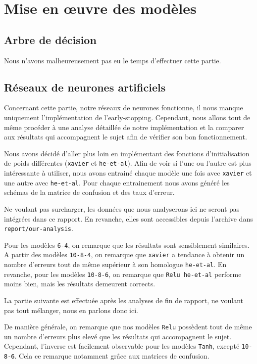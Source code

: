 \chapter{Mise en œuvre des modèles}

\section{Arbre de décision}

Nous n'avons malheureusement pas eu le temps d'effectuer cette partie.

\section{Réseaux de neurones artificiels}

Concernant cette partie, notre réseaux de neurones fonctionne, il nous manque uniquement l'implémentation de l'early-stopping. Cependant, nous allons tout de même procéder à une analyse détaillée de notre implémentation et la comparer aux résultats qui accompagnent le sujet afin de vérifier son bon fonctionnement.

Nous avons décidé d'aller plus loin en implémentant des fonctions d'initialisation de poids différentes (\texttt{xavier} et \texttt{he-et-al}). Afin de voir si l'une ou l'autre est plus intéressante à utiliser, nous avons entrainé chaque modèle une fois avec \texttt{xavier} et une autre avec \texttt{he-et-al}. Pour chaque entrainement nous avons généré les schémas de la matrice de confusion et des taux d'erreur.

Ne voulant pas surcharger, les données que nous analyserons ici ne seront pas intégrées dans ce rapport. En revanche, elles sont accessibles depuis l'archive dans \texttt{report/our-analysis}.

Pour les modèles \texttt{6-4}, on remarque que les résultats sont sensiblement similaires.
A partir des modèles \texttt{10-8-4}, on remarque que \texttt{xavier} a tendance à obtenir un nombre d'erreurs tout de même supérieur à son homologue \texttt{he-et-al}. En revanche, pour les modèles \texttt{10-8-6}, on remarque que \texttt{Relu he-et-al} performe moins bien, mais les résultats demeurent corrects.

La partie suivante est effectuée après les analyses de fin de rapport, ne voulant pas tout mélanger, nous en parlons donc ici.

De manière générale, on remarque que nos modèles \texttt{Relu} possèdent tout de même un nombre d'erreurs plus elevé que les résultats qui accompagnent le sujet. Cependant, l'inverse est facilement observable pour les modèles \texttt{Tanh}, excepté \texttt{10-8-6}. Cela ce remarque notamment grâce aux matrices de confusion.

